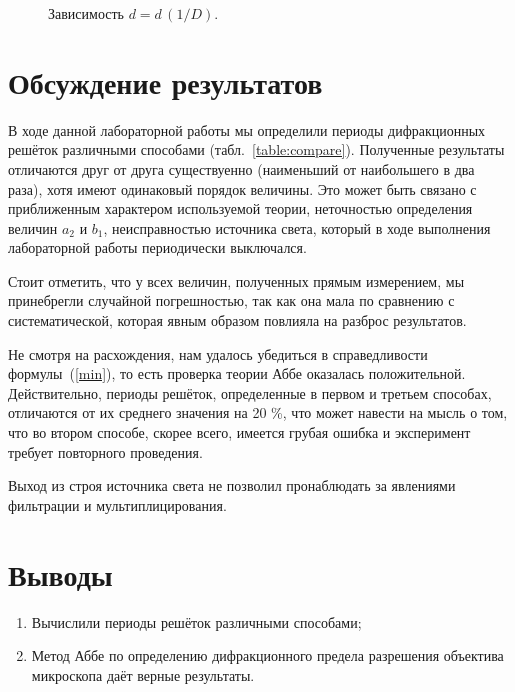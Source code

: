 \documentclass[a4paper,12pt]{article} %
\begin{document}
	
	\begin{figure}[H]
		\caption{Зависимость $d=d\,(1/D)$.}
		\label{ris:d=d(1/D)}
	\end{figure}


\section {Обсуждение результатов}
	В ходе данной лабораторной работы мы определили периоды дифракционных решёток различными способами (табл.~\ref{table:compare}). Полученные результаты отличаются друг от друга существуенно (наименьший от наибольшего в два раза), хотя имеют одинаковый порядок величины. Это может быть связано с приближенным характером используемой теории, неточностью определения величин $a_2$ и $b_1$, неисправностью источника света, который в ходе выполнения лабораторной работы периодически выключался. 
	
	Стоит отметить, что у всех величин, полученных прямым измерением, мы принебрегли случайной погрешностью, так как она мала по сравнению с систематической, которая явным образом повлияла на разброс результатов.
	
	Не смотря на расхождения, нам удалось убедиться в справедливости формулы~(\ref{min}), то есть проверка теории Аббе оказалась положительной. Действительно, периоды решёток, определенные в первом и третьем способах, отличаются от их среднего значения на 20 \%, что может навести на мысль о том, что во втором способе, скорее всего, имеется грубая ошибка и эксперимент требует повторного проведения.
	
	Выход из строя источника света не позволил пронаблюдать за явлениями фильтрации и мультиплицирования.
	
\newpage	
\section{Выводы}
	\begin{enumerate}
		\item 
			Вычислили периоды решёток различными способами;
		\item 
			Метод Аббе по определению дифракционного предела разрешения объектива микроскопа даёт верные результаты.
		
	\end{enumerate}
\end{document}
